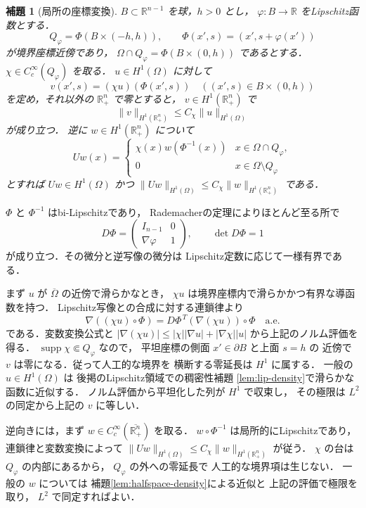 \documentclass[a5paper,10pt,onecolumn]{jsarticle}
\makeatletter
\theoremstyle{mathnotetheorem}
\newtheorem{lemma}[theorem]{補題}
\renewcommand{\proofname}{証明}
\renewenvironment{proof}[1][\proofname]{%
  \par\pushQED{\qed}\normalfont\topsep4\p@\@plus2\p@\relax
  \trivlist\item[\hskip\labelsep\bfseries #1]\ignorespaces
}{\popQED\endtrivlist\@endpefalse}
\newcommand{\norm}[1]{\lVert #1\rVert}
\makeatother
\begin{document}
\begin{lemma}[局所の座標変換]
\label{lem:chart-H1}
$B\subset\mathbb R^{n-1}$ を球，$h>0$ とし，
$\varphi:B\to\mathbb R$ をLipschitz函数とする．
\[
 Q_\varphi=\Phi(B\times(-h,h)),\qquad
 \Phi(x',s)=(x',s+\varphi(x'))
\]
が境界座標近傍であり，
$\Omega\cap Q_\varphi=\Phi(B\times(0,h))$
であるとする．
$\chi\in C_c^\infty(Q_\varphi)$ を取る．
$u\in H^1(\Omega)$ に対して
\[
 v(x',s)=(\chi u)(\Phi(x',s))
 \quad ((x',s)\in B\times(0,h))
\]
を定め，それ以外の $\mathbb R^n_+$ で零とすると，
$v\in H^1(\mathbb R^n_+)$ で
\[
 \norm v_{H^1(\mathbb R^n_+)}
 \le C_\chi\norm u_{H^1(\Omega)}
\]
が成り立つ．
逆に $w\in H^1(\mathbb R^n_+)$ について
\[
 Uw(x)=
 \begin{cases}
 \chi(x)w(\Phi^{-1}(x))&x\in\Omega\cap Q_\varphi,\\
 0&x\in\Omega\setminus Q_\varphi
 \end{cases}
\]
とすれば $Uw\in H^1(\Omega)$ かつ
$\norm{Uw}_{H^1(\Omega)}
 \le C_\chi\norm w_{H^1(\mathbb R^n_+)}$ である．
\end{lemma}
\begin{proof}
$\Phi$ と $\Phi^{-1}$ はbi-Lipschitzであり，
Rademacherの定理によりほとんど至る所で
\[
 D\Phi=
 \begin{pmatrix}I_{n-1}&0\\ \nabla\varphi&1\end{pmatrix},
 \qquad
 \det D\Phi=1
\]
が成り立つ．その微分と逆写像の微分は
Lipschitz定数に応じて一様有界である．

まず $u$ が $\overline\Omega$ の近傍で滑らかなとき，
$\chi u$ は境界座標内で滑らかかつ有界な導函数を持つ．
Lipschitz写像との合成に対する連鎖律より
\[
 \nabla((\chi u)\circ\Phi)
 =D\Phi^{\,T}(\nabla(\chi u))\circ\Phi
 \quad\text{a.e.}
\]
である．変数変換公式と
$|\nabla(\chi u)|\le
 |\chi||\nabla u|+|\nabla\chi||u|$
から上記のノルム評価を得る．
$\operatorname{supp}\chi\Subset Q_\varphi$ なので，
平坦座標の側面 $x'\in\partial B$ と上面 $s=h$ の
近傍で $v$ は零になる．従って人工的な境界を
横断する零延長は $H^1$ に属する．
一般の $u\in H^1(\Omega)$ は
後掲のLipschitz領域での稠密性補題
\ref{lem:lip-density}で滑らかな函数に近似する．
ノルム評価から平坦化した列が $H^1$ で収束し，
その極限は $L^2$ の同定から上記の $v$ に等しい．

逆向きには，まず
$w\in C_c^\infty(\overline{\mathbb R^n_+})$ を取る．
$w\circ\Phi^{-1}$ は局所的にLipschitzであり，
連鎖律と変数変換によって
$\norm{Uw}_{H^1(\Omega)}
 \le C_\chi\norm w_{H^1(\mathbb R^n_+)}$
が従う．
$\chi$ の台は $Q_\varphi$ の内部にあるから，
$Q_\varphi$ の外への零延長で
人工的な境界項は生じない．
一般の $w$ については
補題\ref{lem:halfspace-density}による近似と
上記の評価で極限を取り，
$L^2$ で同定すればよい．
\end{proof}
\end{document}
